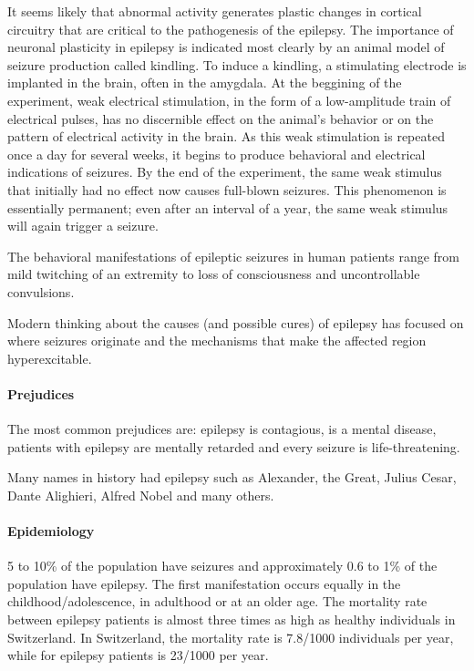 \documentclass[12pt,article,oneside,a4paper]{memoir}
\begin{document}
It seems likely that abnormal activity generates plastic changes in cortical circuitry that are critical to the pathogenesis of the epilepsy. The importance of neuronal plasticity in epilepsy is indicated most clearly by an animal model of seizure production called kindling. To induce a kindling, a stimulating electrode is implanted in the brain, often in the amygdala. At the beggining of the experiment, weak electrical stimulation, in the form of a low-amplitude train of electrical pulses, has no discernible effect on the animal’s behavior or on the pattern of electrical activity in the brain. As this weak stimulation is repeated once a day for several weeks, it begins to produce behavioral and electrical indications of seizures. By the end of the experiment, the same weak stimulus that initially had no effect now causes full-blown seizures. This phenomenon is essentially permanent; even after an interval of a year, the same weak stimulus will again trigger a seizure. 

The behavioral manifestations of epileptic seizures in human patients range from mild twitching of an extremity to loss of consciousness and uncontrollable convulsions. 

Modern thinking about the causes (and possible cures) of epilepsy has focused on where seizures originate and the mechanisms that make the affected region hyperexcitable. 

\paragraph{Prejudices} The most common prejudices are: epilepsy is contagious, is a mental disease, patients with epilepsy are mentally retarded and every seizure is life-threatening.

Many names in history had epilepsy such as Alexander, the Great, Julius Cesar, Dante Alighieri, Alfred Nobel and many others.

\paragraph{Epidemiology}
5 to 10\% of the population have seizures and approximately 0.6 to 1\% of the population have epilepsy. The first manifestation occurs equally in the childhood/adolescence, in adulthood or at an older age.
The mortality rate between epilepsy patients is almost three times as high as healthy individuals in Switzerland. In Switzerland, the mortality rate is 7.8/1000 individuals per year, while for epilepsy patients is 23/1000 per year.
\end{document}

